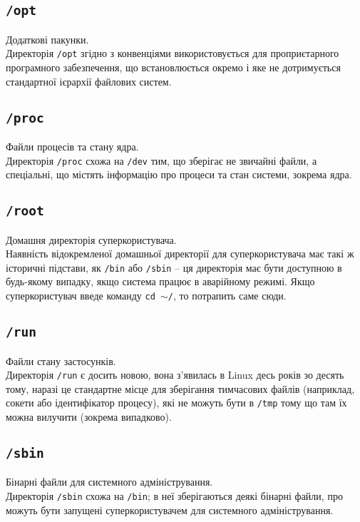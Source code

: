 \documentclass[10pt,a4paper]{fancyhandout}
\begin{document}
	\subsection{\texttt{/opt}}
	Додаткові пакунки. \\
	Директорія \texttt{/opt} згідно з конвенціями використовується для проприєтарного програмного забезпечення, що встановлюється окремо і яке не дотримується стандартної ієрархії файлових систем.
	\goodbreak
	
	\subsection{\texttt{/proc}}
	Файли процесів та стану ядра. \\
	Директорія \texttt{/proc} схожа на \texttt{/dev} тим, що зберігає не звичайні файли, а спеціальні, що містять інформацію про процеси та стан системи, зокрема ядра.
	\goodbreak
	
	\subsection{\texttt{/root}}
	Домашня директорія суперкористувача. \\
	Наявність відокремленої домашньої директорії для суперкористувача має такі ж історичні підстави, як \texttt{/bin} або \texttt{/sbin} -- ця директорія має бути доступною в будь-якому випадку, якщо система працює в аварійному режимі. Якщо суперкористувач введе команду \texttt{cd $\sim$/}, то потрапить саме сюди.
	\goodbreak
	
	\subsection{\texttt{/run}}
	Файли стану застосунків. \\
	Директорія \texttt{/run} є досить новою, вона з'явилась в Linux десь років зо десять тому, наразі це стандартне місце для зберігання тимчасових файлів (наприклад, сокети або ідентифікатор процесу), які не можуть бути в \texttt{/tmp} тому що там їх можна вилучити (зокрема випадково).
	\goodbreak
	
	\subsection{\texttt{/sbin}}
	Бінарні файли для системного адміністрування. \\
	Директорія \texttt{/sbin} схожа на \texttt{/bin}; в неї зберігаються деякі бінарні файли, про можуть бути запущені суперкористувачем для системного адміністрування.
	\goodbreak
	
\end{document}
